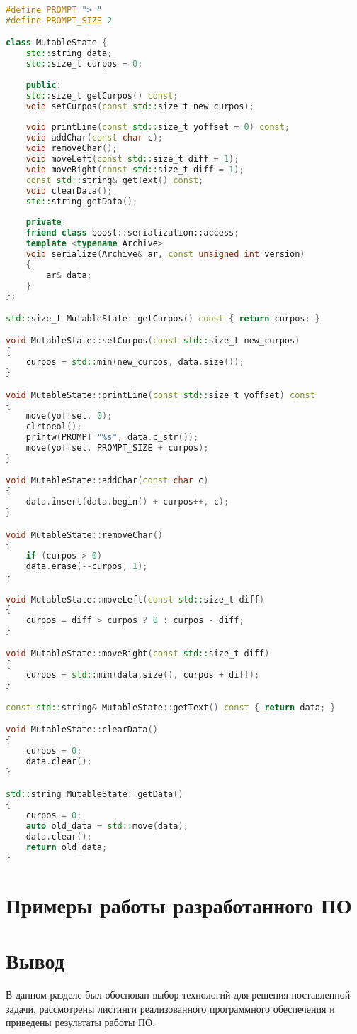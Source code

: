 \begin{lstlisting}[label=lst:mutable-state,caption=Класс\, описывающий изменяемое состояние системы,language=c++]
#define PROMPT "> "
#define PROMPT_SIZE 2

class MutableState {
	std::string data;
	std::size_t curpos = 0;
	
	public:
	std::size_t getCurpos() const;
	void setCurpos(const std::size_t new_curpos);
	
	void printLine(const std::size_t yoffset = 0) const;
	void addChar(const char c);
	void removeChar();
	void moveLeft(const std::size_t diff = 1);
	void moveRight(const std::size_t diff = 1);
	const std::string& getText() const;
	void clearData();
	std::string getData();
	
	private:
	friend class boost::serialization::access;
	template <typename Archive>
	void serialize(Archive& ar, const unsigned int version)
	{
		ar& data;
	}
};

std::size_t MutableState::getCurpos() const { return curpos; }

void MutableState::setCurpos(const std::size_t new_curpos)
{
	curpos = std::min(new_curpos, data.size());
}

void MutableState::printLine(const std::size_t yoffset) const
{
	move(yoffset, 0);
	clrtoeol();
	printw(PROMPT "%s", data.c_str());
	move(yoffset, PROMPT_SIZE + curpos);
}

void MutableState::addChar(const char c)
{
	data.insert(data.begin() + curpos++, c);
}

void MutableState::removeChar()
{
	if (curpos > 0)
	data.erase(--curpos, 1);
}

void MutableState::moveLeft(const std::size_t diff)
{
	curpos = diff > curpos ? 0 : curpos - diff;
}

void MutableState::moveRight(const std::size_t diff)
{
	curpos = std::min(data.size(), curpos + diff);
}

const std::string& MutableState::getText() const { return data; }

void MutableState::clearData()
{
	curpos = 0;
	data.clear();
}

std::string MutableState::getData()
{
	curpos = 0;
	auto old_data = std::move(data);
	data.clear();
	return old_data;
}
\end{lstlisting}

\section{Примеры работы разработанного ПО}

\section*{Вывод}

В данном разделе был обоснован выбор технологий для решения поставленной задачи, рассмотрены листинги реализованного программного обеспечения и приведены результаты работы ПО.